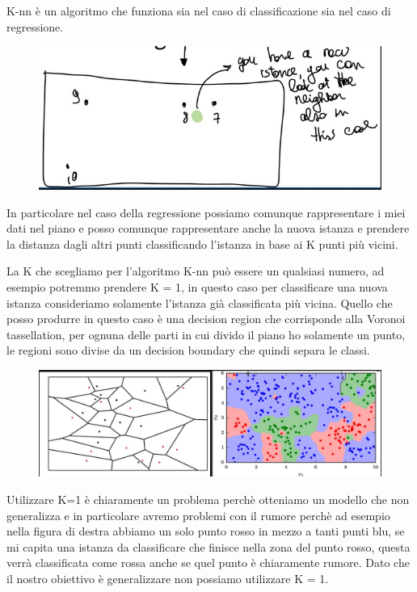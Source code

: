 \documentclass[14pt]{extreport}
\begin{document}
K-nn è un algoritmo che funziona sia nel caso di classificazione sia nel caso di regressione.

\begin{figure}[H]
\centering
\includegraphics[width=0.7\linewidth]{57.jpeg}
\end{figure}

In particolare nel caso della regressione possiamo comunque rappresentare i miei dati nel piano e posso comunque rappresentare anche la nuova istanza
e prendere la distanza dagli altri punti classificando l’istanza in base ai K punti più vicini.

La K che scegliamo per l’algoritmo K-nn può essere un qualsiasi numero, ad esempio potremmo prendere K = 1, in questo caso per classificare una nuova
istanza consideriamo solamente l’istanza già classificata più vicina. Quello che posso produrre in questo caso è una decision region che corrisponde
alla Voronoi tassellation, per ognuna delle parti in cui divido il piano ho solamente un punto, le regioni sono divise da un decision boundary che
quindi separa le classi.

\begin{figure}[H]
\centering
\includegraphics[width=0.7\linewidth]{58.jpeg}
\end{figure}

Utilizzare K=1 è chiaramente un problema perchè otteniamo un modello che non generalizza e in particolare avremo problemi con il rumore perchè ad
esempio nella figura di destra abbiamo un solo punto rosso in mezzo a tanti punti blu, se mi capita una istanza da classificare che finisce nella zona
del punto rosso, questa verrà classificata come rossa anche se quel punto è chiaramente rumore. Dato che il nostro obiettivo è generalizzare non
possiamo utilizzare K = 1.
\end{document}
